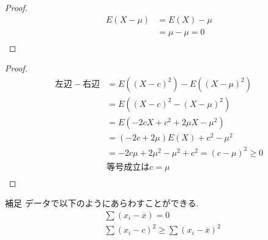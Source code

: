 \documentclass[dvipdfmx,10pt, a4j]{jarticle}
\theoremstyle{definition}
\begin{document}
\begin{proof}
    \begin{align*}
        E(X-\mu) & = E(X) - \mu    \\
                 & = \mu - \mu = 0 \\
    \end{align*}
\end{proof}
\begin{proof}
    \begin{align*}
        左辺 - 右辺 & = E((X -c)^2) - E((X-\mu)^2)                        \\
                    & =E((X-c)^2 - (X-\mu)^2)                             \\
                    & =E(-2cX + c^2 + 2 \mu X - \mu^2)                    \\
                    & =(-2c + 2\mu)E(X) + c^2 -\mu^2                      \\
                    & = -2c\mu + 2 \mu^2 - \mu^2 + c^2 = (c-\mu)^2 \geq 0 \\
                    & 等号成立は c = \mu                                  \\
    \end{align*}
\end{proof}
\begin{itembox}[l]{補足}
    データで以下のようにあらわすことができる.
    \begin{align*}
         & \sum (x_i - \overline{x}) = 0                    \\
         & \sum (x_i -c)^2 \geq \sum (x_i - \overline{x})^2 \\
    \end{align*}
\end{itembox}\\
\end{document}
